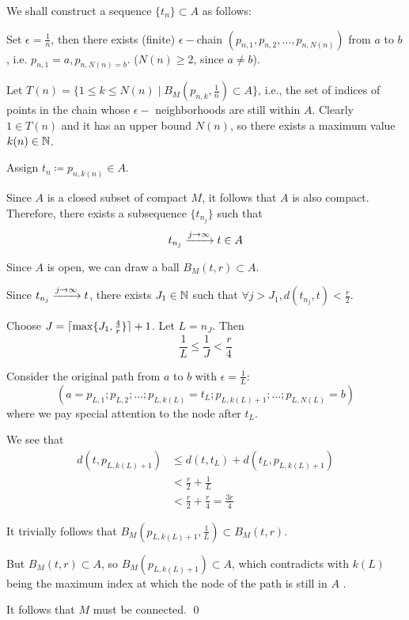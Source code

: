 \documentclass[a4paper, 12pt]{article}
\begin{document}
\begin{solution}
    We shall construct a sequence $\{t_n\} \subset A$ as follows:

    Set $\epsilon = \frac{1}{n}$, then there exists (finite) $\epsilon-$chain $(p_{n, 1}, p_{n, 2}, \dots, p_{n, N(n)})$ from $a$ to $b$, i.e. $p_{n, 1} = a, p_{n, N(n) = b}$. ($N(n) \geq 2$, since $a \neq b$).

    Let $T(n) = \{1 \leq k \leq N(n) \mid B_M(p_{n, k}, \frac{1}{n}) \subset A\}$, i.e., the set of indices of points in the chain whose $\epsilon-$ neighborhoods are still within $A$. Clearly $1 \in T(n)$ and it has an upper bound $N(n)$, so there exists a maximum value $k(n) \in \mathbb{N}$.

    Assign $t_n \coloneqq p_{n, k(n)} \in A$.

    Since $A$ is a closed subset of compact $M$, it follows that $A$ is also compact. Therefore, there exists a subsequence $\{t_{n_j}\} $ such that \[
        t_{n_j} \xrightarrow{j \to \infty} t \in A
    \]

    Since $A$ is open, we can draw a ball $B_M(t, r) \subset A$.

    Since $t_{n_j} \xrightarrow{j \to \infty} t$, there exists $J_1\in \mathbb{N}$ such that $\forall j > J_1, d(t_{n_j}, t) < \frac{r}{2}$.

    Choose $J = \lceil\max\{J_1, \frac{4}{r}\}\rceil + 1$. Let $L = n_J$. Then \[
        \frac{1}{L} \leq \frac{1}{J} < \frac{r}{4}
    \]

    Consider the original path from $a$ to $b$ with $\epsilon = \frac{1}{L}$:
    \[
        (a = p_{L, 1}; p_{L, 2}; \dots ; p_{L, k(L)} = t_{L} ; p_{L, k(L) + 1} ; \dots ; p_{L, N(L)} = b)
    \]
    where we pay special attention to the node after $t_L$.

    We see that \begin{align*}
        d(t, p_{L, k(L) + 1}) & \leq d(t, t_L) + d(t_L, p_{L, k(L) + 1})   \\
                              & < \frac{r}{2} + \frac{1}{L}                \\
                              & < \frac{r}{2} + \frac{r}{4} = \frac{3r}{4}
    \end{align*}

    It trivially follows that $B_M(p_{L, k(L) + 1}, \frac{1}{L}) \subset B_M(t, r)$.

    But $B_M(t, r) \subset A$, so $B_M(p_{L, k(L) + 1}) \subset A$, which contradicts with $k(L)$ being the maximum index at which the node of the path is still in $A$ \contra.

    It follows that $M$ must be connected. \qed


\end{solution}
\end{document}
